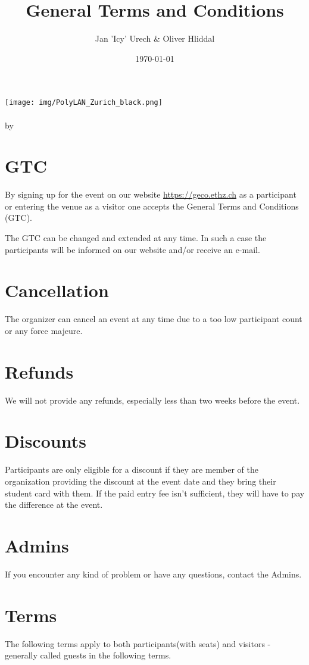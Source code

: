 \documentclass{article}
\title{General Terms and Conditions}
\author{Jan 'Icy' Urech \& Oliver Hliddal}
\date{\today}
\begin{document}
\makeatletter
\begin{titlepage}
\centering
\texttt{[image: img/PolyLAN\_Zurich\_black.png]}\\
\LARGE \@title\\ \normalsize by \@author\\ \@date
\end{titlepage}
\makeatother


\clearpage

\tableofcontents
\clearpage


\section{GTC}
By signing up for the event on our website \url{https://geco.ethz.ch} as a participant or entering the venue as a visitor one accepts the General Terms and Conditions (GTC).

The GTC can be changed and extended at any time. In such a case the participants will be informed on our website and/or receive an e-mail.


\section{Cancellation}
The organizer can cancel an event at any time due to a too low participant count or any force majeure.

\section{Refunds}
We will not provide any refunds, especially less than two weeks before the event.

\section{Discounts}
Participants are only eligible for a discount if they are member of the organization providing the discount at the event date and they bring their student card with them. If the paid entry fee isn't sufficient, they will have to pay the difference at the event.

\section{Admins}
If you encounter any kind of problem or have any questions, contact the Admins.

\section{Terms}
The following terms apply to both participants(with seats) and visitors - generally called guests in the following terms.
\end{document}
